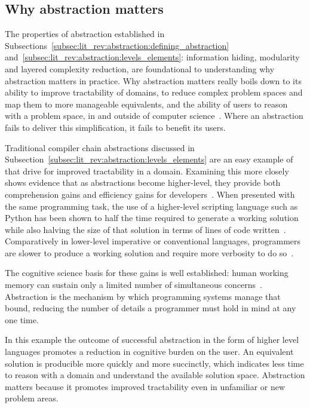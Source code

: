\subsection{Why abstraction matters}\label{subsec:lit_rev:abstraction:why_matters}
The properties of abstraction established in Subsections~\ref{subsec:lit_rev:abstraction:defining_abstraction} and~\ref{subsec:lit_rev:abstraction:levels_elements}: information hiding, modularity and layered complexity reduction, are foundational to understanding why abstraction matters in practice.
Why abstraction matters really boils down to its ability to improve tractability of domains, to reduce complex problem spaces and map them to more manageable equivalents, and the ability of users to reason with a problem space, in and outside of computer science~\cite{Wing2006ComputationalThinking}.
Where an abstraction fails to deliver this simplification, it fails to benefit its users.

Traditional compiler chain abstractions discussed in Subsection~\ref{subsec:lit_rev:abstraction:levels_elements} are an easy example of that drive for improved tractability in a domain.
Examining this more closely shows evidence that as abstractions become higher-level, they provide both comprehension gains and efficiency gains for developers~\cite{Prechelt2000EmpiricalComparison}.
When presented with the same programming task, the use of a higher-level scripting language such as Python has been shown to half the time required to generate a working solution while also halving the size of that solution in terms of lines of code written~\cite{Prechelt2000EmpiricalComparison}.
Comparatively in lower-level imperative or conventional languages, programmers are slower to produce a working solution and require more verbosity to do so~\cite{Prechelt2000EmpiricalComparison}.

The cognitive science basis for these gains is well established: human working memory can sustain only a limited number of simultaneous concerns~\cite{miller1956magicalnumber}.
Abstraction is the mechanism by which programming systems manage that bound, reducing the number of details a programmer must hold in mind at any one time.

In this example the outcome of successful abstraction in the form of higher level languages promotes a reduction in cognitive burden on the user.
An equivalent solution is producible more quickly and more succinctly, which indicates less time to reason with a domain and understand the available solution space.
Abstraction matters because it promotes improved tractability even in unfamiliar or new problem areas.

